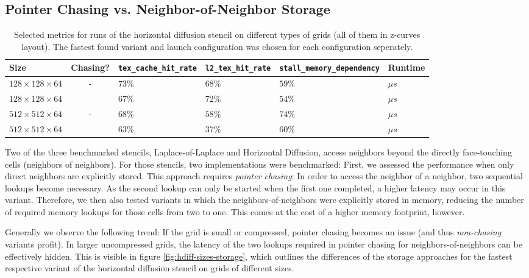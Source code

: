 \subsection{Pointer Chasing vs. Neighbor-of-Neighbor Storage}
\label{sec:results-chasing}

\begin{table}
	\begin{tabular}{l c p{1.5cm} p{1.5cm} p{2.5cm} l}
		\hline
		\textbf{Size} & \textbf{Chasing?} & \textbf{\texttt{tex\_\allowbreak cache\_\allowbreak hit\_\allowbreak rate}} & \textbf{\texttt{l2\_\allowbreak tex\_\allowbreak hit\_\allowbreak rate}} & \textbf{\texttt{stall\_\allowbreak memory\_\allowbreak dependency}} & \textbf{Runtime} \\
		\hline
		\hline
		$128\times 128\times 64$ & - & 			$73\%$ & $68\%$ & $59\%$ & $\mu s$ \\
		$128\times 128\times 64$ & \checkmark & $67\%$ & $72\%$ & $54\%$ & $\mu s$ \\
		\hline
		$512\times 512\times 64$ & - & 			$68\%$ & $58\%$ & $74\%$ & $\mu s$ \\
		$512\times 512\times 64$ & \checkmark & $63\%$ & $37\%$ & $60\%$ & $\mu s$ \\
		\hline
	\end{tabular}
	\caption{\label{tab:chasing} Selected metrics for runs of the horizontal diffusion stencil on different types of grids (all of them in z-curves layout). The fastest found variant and launch configuration was chosen for each configuration seperately.}
\end{table}

Two of the three benchmarked stencils, Laplace-of-Laplace and Horizontal Diffusion, access neighbors beyond the directly face-touching cells (neighbors of neighbors). For those stencils, two implementations were benchmarked: First, we assessed the performance when only direct neighbors are explicitly stored. This approach requires \emph{pointer chasing}: In order to access the neighbor of a neighbor, two sequential lookups become necessary. As the second lookup can only be started when the first one completed, a higher latency may occur in this variant. Therefore, we then also tested variants in which the neighbors-of-neighbors were explicitly stored in memory, reducing the number of required memory lookups for those cells from two to one. This comes at the cost of a higher memory footprint, however.

Generally we observe the following trend: If the grid is small or compressed, pointer chasing becomes an issue (and thus \emph{non-chasing} variants profit). In larger uncompressed grids, the latency of the two lookups required in pointer chasing for neighbors-of-neighbors can be effectively hidden. This is visible in figure \ref{fig:hdiff-sizes-storage}, which outlines the differences of the storage approaches for the fastest respective variant of the horizontal diffusion stencil on grids of different sizes. 

